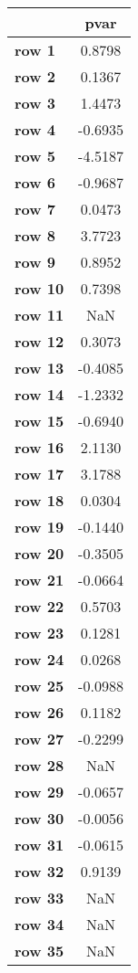 \begin{tiny}\begin{tabular}{|l|c|}
\hline
&\textbf{pvar}\\\hline
\textbf{row 1}&0.8798\\\hline
\textbf{row 2}&0.1367\\\hline
\textbf{row 3}&1.4473\\\hline
\textbf{row 4}&-0.6935\\\hline
\textbf{row 5}&-4.5187\\\hline
\textbf{row 6}&-0.9687\\\hline
\textbf{row 7}&0.0473\\\hline
\textbf{row 8}&3.7723\\\hline
\textbf{row 9}&0.8952\\\hline
\textbf{row 10}&0.7398\\\hline
\textbf{row 11}&NaN\\\hline
\textbf{row 12}&0.3073\\\hline
\textbf{row 13}&-0.4085\\\hline
\textbf{row 14}&-1.2332\\\hline
\textbf{row 15}&-0.6940\\\hline
\textbf{row 16}&2.1130\\\hline
\textbf{row 17}&3.1788\\\hline
\textbf{row 18}&0.0304\\\hline
\textbf{row 19}&-0.1440\\\hline
\textbf{row 20}&-0.3505\\\hline
\textbf{row 21}&-0.0664\\\hline
\textbf{row 22}&0.5703\\\hline
\textbf{row 23}&0.1281\\\hline
\textbf{row 24}&0.0268\\\hline
\textbf{row 25}&-0.0988\\\hline
\textbf{row 26}&0.1182\\\hline
\textbf{row 27}&-0.2299\\\hline
\textbf{row 28}&NaN\\\hline
\textbf{row 29}&-0.0657\\\hline
\textbf{row 30}&-0.0056\\\hline
\textbf{row 31}&-0.0615\\\hline
\textbf{row 32}&0.9139\\\hline
\textbf{row 33}&NaN\\\hline
\textbf{row 34}&NaN\\\hline
\textbf{row 35}&NaN\\\hline

\end{tabular}
\end{tiny}
